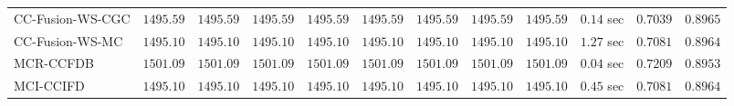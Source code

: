 \begin{table}[H]
\begin{tabular}{lrrrrrrrrrrr}
    CC-Fusion-WS-CGC & $      1495.59$ & $      1495.59$ & $      1495.59$ & $      1495.59$ & $      1495.59$ & $      1495.59$ & $      1495.59$ & $      1495.59$ & $         0.14$ sec    & $       0.7039$  & $       0.8965$ \\ 
     CC-Fusion-WS-MC & $      1495.10$ & $      1495.10$ & $      1495.10$ & $      1495.10$ & $      1495.10$ & $      1495.10$ & $      1495.10$ & $      1495.10$ & $         1.27$ sec    & $       0.7081$  & $       0.8964$ \\ 
\cmidrule{1-1} 
           MCR-CCFDB & $      1501.09$ & $      1501.09$ & $      1501.09$ & $      1501.09$ & $      1501.09$ & $      1501.09$ & $      1501.09$ & $      1501.09$ & $         0.04$ sec    & $       0.7209$  & $       0.8953$ \\ 
\cmidrule{1-1} 
           MCI-CCIFD & $      1495.10$ & $      1495.10$ & $      1495.10$ & $      1495.10$ & $      1495.10$ & $      1495.10$ & $      1495.10$ & $      1495.10$ & $         0.45$ sec    & $       0.7081$  & $       0.8964$ \\ 
\bottomrule
\end{tabular}
\end{table}

